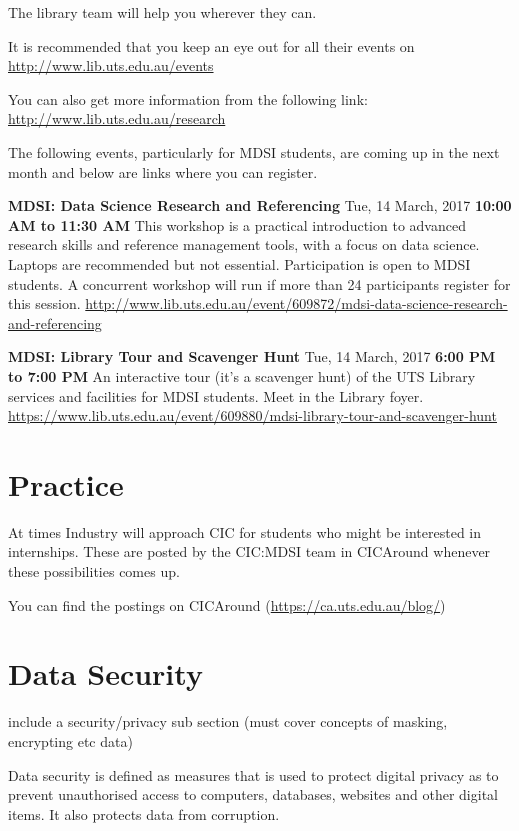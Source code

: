 \documentclass[]{book}
\theoremstyle{definition}
\theoremstyle{definition}
\theoremstyle{remark}
\begin{document}
The library team will help you wherever they can.

It is recommended that you keep an eye out for all their events on
\url{http://www.lib.uts.edu.au/events}

You can also get more information from the following link:
\url{http://www.lib.uts.edu.au/research}

The following events, particularly for MDSI students, are coming up in
the next month and below are links where you can register.

\textbf{MDSI: Data Science Research and Referencing} Tue, 14 March, 2017
\textbf{10:00 AM to 11:30 AM} This workshop is a practical introduction
to advanced research skills and reference management tools, with a focus
on data science. Laptops are recommended but not essential.
Participation is open to MDSI students. A concurrent workshop will run
if more than 24 participants register for this session.
\url{http://www.lib.uts.edu.au/event/609872/mdsi-data-science-research-and-referencing}

\textbf{MDSI: Library Tour and Scavenger Hunt} Tue, 14 March, 2017
\textbf{6:00 PM to 7:00 PM} An interactive tour (it's a scavenger hunt)
of the UTS Library services and facilities for MDSI students. Meet in
the Library foyer.
\url{https://www.lib.uts.edu.au/event/609880/mdsi-library-tour-and-scavenger-hunt}

\section{Practice}\label{practice}

At times Industry will approach CIC for students who might be interested
in internships. These are posted by the CIC:MDSI team in CICAround
whenever these possibilities comes up.

You can find the postings on CICAround
(\url{https://ca.uts.edu.au/blog/})

\section{Data Security}\label{data-security}

include a security/privacy sub section (must cover concepts of masking,
encrypting etc data)

Data security is defined as measures that is used to protect digital
privacy as to prevent unauthorised access to computers, databases,
websites and other digital items. It also protects data from corruption.
\end{document}
